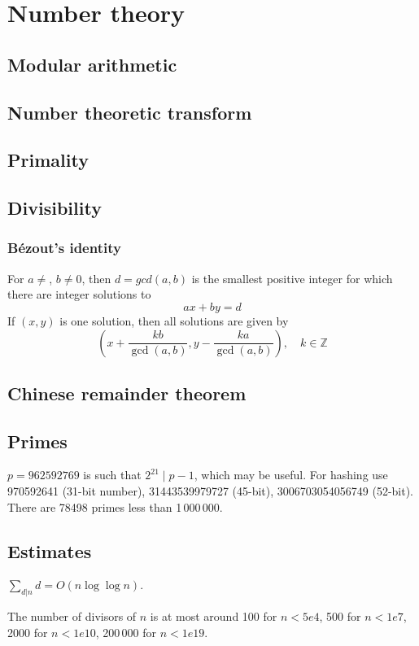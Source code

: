 \chapter{Number theory}

\section{Modular arithmetic}

\section{Number theoretic transform}

\section{Primality}

\section{Divisibility}

	\subsection{Bézout's identity}
	For $a \neq $, $b \neq 0$, then $d=gcd(a,b)$ is the smallest positive integer for which there are integer solutions to
	$$ax+by=d$$
	If $(x,y)$ is one solution, then all solutions are given by
	$$\left(x+\frac{kb}{\gcd(a,b)}, y-\frac{ka}{\gcd(a,b)}\right), \quad k\in\mathbb{Z}$$


\section{Chinese remainder theorem}

\section{Primes}
	$p=962592769$ is such that $2^{21} \mid p-1$, which may be useful. For hashing
	use 970592641 (31-bit number), 31443539979727 (45-bit), 3006703054056749
	(52-bit). There are 78498 primes less than 1\,000\,000.

\section{Estimates}
	$\sum_{d|n} d = O(n \log \log n)$.

	The number of divisors of $n$ is at most around 100 for $n < 5e4$, 500 for $n < 1e7$, 2000 for $n < 1e10$, 200\,000 for $n < 1e19$.

\hardcolumnbreak
